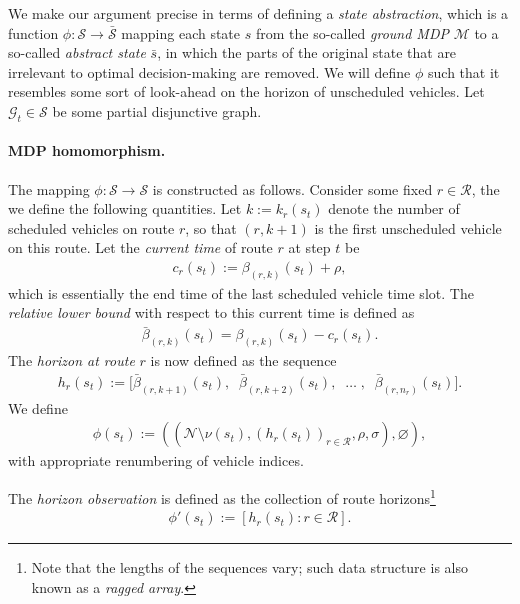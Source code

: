 \documentclass[a4paper]{report}
\theoremstyle{definition}
\theoremstyle{plain}
\newcommand\note[1]{{\color{Navy}\noindent#1}}
\begin{document}
We make our argument precise in terms of defining a \emph{state abstraction},
which is a function $\phi : \mathcal{S} \rightarrow \bar{\mathcal{S}}$ mapping
each state $s$ from the so-called \emph{ground MDP} $\mathcal{M}$ to a so-called
\emph{abstract state} $\bar{s}$, in which the parts of the original state that
are irrelevant to optimal decision-making are removed.
%
We will define $\phi$ such that it resembles some sort of look-ahead on the
horizon of unscheduled vehicles.
%
Let $\mathcal{G}_t \in \mathcal{S}$ be some partial disjunctive graph.

\paragraph{MDP homomorphism.}
The mapping $\phi : \mathcal{S} \rightarrow \mathcal{S}$ is constructed as follows.
%
Consider some fixed $r \in \mathcal{R}$, the we define the following quantities.
%
Let $k := k_r(s_t)$ denote the number of scheduled vehicles on route
$r$, so that $(r, k+1)$ is the first unscheduled vehicle on this route.
%
Let the \emph{current time} of route $r$ at step $t$ be
\begin{align}
  c_r(s_t) := \beta_{(r, k)}(s_t) + \rho ,
\end{align}
which is essentially the end time of the last scheduled vehicle time slot.
%
%
The \emph{relative lower bound} with respect to this current time is defined
as
\begin{align}
  \bar{\beta}_{(r, k)}(s_t) = \beta_{(r,k)}(s_t) - c_r(s_t).
\end{align}
%
The \emph{horizon at route} $r$ is now defined as the sequence
\begin{align}
  h_r(s_t) := \Big[\bar{\beta}_{(r, k\!+\!1)}(s_t), \;\; \bar{\beta}_{(r, k\!+\!2)}(s_t), \;\; \dots \; , \;\; \bar{\beta}_{(r, n_r)}(s_t) \Big] .
\end{align}
%
We define
\begin{align}
  \phi(s_t) := ((\mathcal{N} \setminus \nu(s_t), (h_r(s_t))_{r \in \mathcal{R}}, \rho, \sigma), \varnothing) ,
\end{align}
with appropriate renumbering of vehicle indices.

\note{
The \emph{horizon observation} is defined as the collection of route
horizons\footnote{Note that the lengths of the sequences vary; such data
  structure is also known as a \emph{ragged array}.}
\begin{align}
  \phi'(s_t) := [h_r(s_t) : r \in \mathcal{R}] .
\end{align}
}
\end{document}
